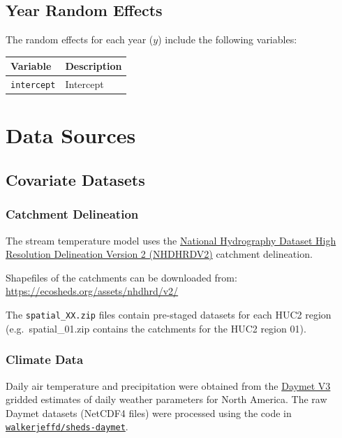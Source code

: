 \documentclass[]{book}
\begin{document}
\hypertarget{year-random-effects}{%
\section{Year Random Effects}\label{year-random-effects}}

The random effects for each year (\(y\)) include the following variables:

\begin{longtable}[]{@{}ll@{}}
\toprule
Variable & Description\tabularnewline
\midrule
\endhead
\texttt{intercept} & Intercept\tabularnewline
\bottomrule
\end{longtable}

\hypertarget{data-sources}{%
\chapter{Data Sources}\label{data-sources}}

\hypertarget{covariate-datasets}{%
\section{Covariate Datasets}\label{covariate-datasets}}

\hypertarget{catchment-delineation}{%
\subsection{Catchment Delineation}\label{catchment-delineation}}

The stream temperature model uses the \href{https://conte-ecology.github.io/shedsGisData/}{National Hydrography Dataset High Resolution Delineation Version 2 (NHDHRDV2)} catchment delineation.

Shapefiles of the catchments can be downloaded from: \url{https://ecosheds.org/assets/nhdhrd/v2/}

The \texttt{spatial\_XX.zip} files contain pre-staged datasets for each HUC2 region (e.g.~spatial\_01.zip contains the catchments for the HUC2 region 01).

\hypertarget{climate-data}{%
\subsection{Climate Data}\label{climate-data}}

Daily air temperature and precipitation were obtained from the \href{https://daymet.ornl.gov/}{Daymet V3} gridded estimates of daily weather parameters for North America. The raw Daymet datasets (NetCDF4 files) were processed using the code in \href{https://github.com/walkerjeffd/sheds-daymet}{\texttt{walkerjeffd/sheds-daymet}}.
\end{document}
